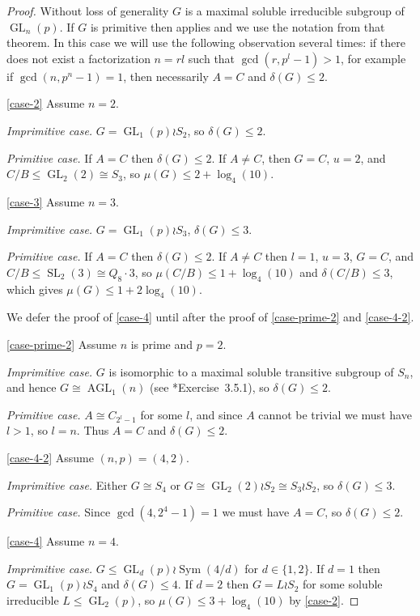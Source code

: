 \documentclass[11pt,reqno]{amsart}
\numberwithin{equation}{section}
\theoremstyle{definition}
\theoremstyle{remark}
\newcommand\opr[1]{\operatorname{#1}}
\def\Sym{\opr{Sym}}
\def\GL{\opr{GL}}
\def\SL{\opr{SL}}
\def\AGL{\opr{AGL}}
\numberwithin{equation}{section}
\begin{document}
\begin{proof}
    Without loss of generality $G$ is a maximal soluble irreducible subgroup of $\GL_n(p)$. If $G$ is primitive then  applies and we use the notation from that theorem.
    In this case we will use the following observation several times: if there does not exist a factorization $n = rl$ such that $\gcd(r, p^l - 1) > 1$, for example if $\gcd(n, p^n - 1) = 1$, then necessarily $A = C$ and $\delta(G) \le 2$.

    \ref{case-2}
    Assume $n = 2$.

    \emph{Imprimitive case.}
    $G = \GL_1(p) \wr S_2$, so $\delta(G)\le 2$.

    \emph{Primitive case.}
    If $A=C$ then $\delta(G)\le 2$.
    If $A\neq C$, then $G=C$, $u=2$, and $C/B\le \GL_2(2) \cong S_3$, so $\mu(G) \le 2 + \log_4(10)$.

    \ref{case-3}
    Assume $n = 3$.

    \emph{Imprimitive case.} $G = \GL_1(p) \wr S_3$, $\delta(G)\le 3$.

    \emph{Primitive case.}
    If $A = C$ then $\delta(G)\le 2$.
    If $A\neq C$ then $l=1$, $u=3$, $G = C$, and $C/B\le \SL_2(3) \cong Q_8 \cdot 3$,
    so $\mu(C / B) \le 1 + \log_4(10)$ and $\delta(C / B) \le 3$,
    which gives $\mu(G) \le 1 + 2 \log_4(10)$.

    We defer the proof of \ref{case-4} until after the proof of \ref{case-prime-2} and \ref{case-4-2}.

    \ref{case-prime-2}
    Assume $n$ is prime and $p = 2$.

    \emph{Imprimitive case.} $G$ is isomorphic to a maximal soluble transitive subgroup of $S_n$, and hence $G \cong \AGL_1(n)$ (see \cite{DM}*{Exercise~3.5.1}), so $\delta(G) \le 2$.

    \emph{Primitive case.} $A \cong C_{2^l - 1}$ for some $l$, and since $A$ cannot be trivial we must have $l > 1$, so $l = n$.
    Thus $A = C$ and $\delta(G)\le 2$.

    \ref{case-4-2}
    Assume $(n, p) = (4, 2)$.

    \emph{Imprimitive case.} Either $G \cong S_4$ or $G \cong \GL_2(2) \wr S_2 \cong S_3 \wr S_2$, so $\delta(G) \le 3$.

    \emph{Primitive case.}
    Since $\gcd(4, 2^4 - 1) = 1$ we must have $A = C$, so $\delta(G) \le 2$.

    \ref{case-4}
    Assume $n = 4$.

    \emph{Imprimitive case.} $G \le \GL_d(p) \wr \Sym(4/d)$ for $d \in \{1, 2\}$.
    If $d = 1$ then $G = \GL_1(p) \wr S_4$ and $\delta(G) \le 4$.
    If $d = 2$ then $G = L \wr S_2$ for some soluble irreducible $L \le \GL_2(p)$, so $\mu(G) \le 3 + \log_4(10)$ by \ref{case-2}.


\end{proof}
\end{document}
